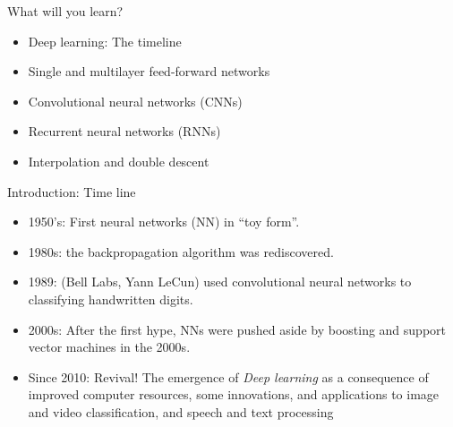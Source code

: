 \documentclass[
  10pt,
  ignorenonframetext,
]{beamer}
\providecommand{\tightlist}{%
  \setlength{\itemsep}{0pt}\setlength{\parskip}{0pt}}
\begin{document}
\begin{frame}
\begin{block}{What will you learn?}
\protect\hypertarget{what-will-you-learn}{}
\(~\)

\begin{itemize}
\tightlist
\item
  Deep learning: The timeline
\end{itemize}

\vspace{2mm}

\begin{itemize}
\tightlist
\item
  Single and multilayer feed-forward networks
\end{itemize}

\vspace{2mm}

\begin{itemize}
\tightlist
\item
  Convolutional neural networks (CNNs)
\end{itemize}

\vspace{2mm}

\begin{itemize}
\tightlist
\item
  Recurrent neural networks (RNNs)
\end{itemize}

\vspace{2mm}

\begin{itemize}
\tightlist
\item
  Interpolation and double descent
\end{itemize}
\end{block}
\end{frame}

\begin{frame}{Introduction: Time line}
\protect\hypertarget{introduction-time-line}{}
\(~\)

\begin{itemize}
\item
  1950's: First neural networks (NN) in ``toy form''.
\item
  1980s: the backpropagation algorithm was rediscovered.
\item
  1989: (Bell Labs, Yann LeCun) used convolutional neural networks to
  classifying handwritten digits.
\item
  2000s: After the first hype, NNs were pushed aside by boosting and
  support vector machines in the 2000s.
\item
  Since 2010: Revival! The emergence of \emph{Deep learning} as a
  consequence of improved computer resources, some innovations, and
  applications to image and video classification, and speech and text
  processing
\end{itemize}

\(~\)
\end{frame}
\end{document}
